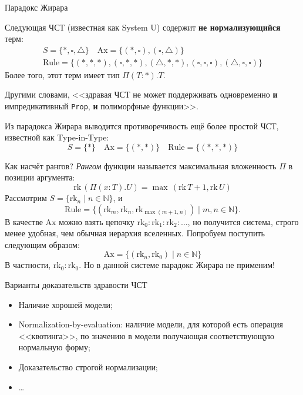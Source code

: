 \documentclass[russian]{beamer}
\begin{document}
\begin{frame}{Парадокс Жирара}
    \begin{theorem}[Girard'72]
    Следующая ЧСТ (известная как System U) содержит
    \textbf{не нормализующийся} терм:
    \[\begin{array}{c}
        S=\{*,\square,\triangle\}
        \quad\mathrm{Ax}=\{
            (*,\square),(\square,\triangle)
        \}
        \\ \mathrm{Rule}=\{
            (*,*,*),(\square,*,*),(\triangle,*,*),
            (\square,\square,\square),
            (\triangle,\square,\square)
        \}
    \end{array}\]
    Более того, этот терм имеет тип $\Pi(T:*).T$.
    \end{theorem}
    Другими словами, <<здравая ЧСТ не может поддерживать
    одновременно \textbf{и} импредикативный
    \texttt{Prop}, \textbf{и} полиморфные функции>>.

    Из парадокса Жирара выводится противоречивость ещё
    более простой ЧСТ, известной как Type-in-Type:
    \[S=\{*\}\quad\mathrm{Ax}=\{(*,*)\}\quad
    \mathrm{Rule}=\{(*,*,*)\}\]
\end{frame}
\begin{frame}{Как насчёт рангов?}
\textit{Рангом} функции называется максимальная
вложенность $\Pi$ в позиции аргумента:
\[\mathrm{rk}\,(\Pi(x:T).U)=\max\,(\mathrm{rk}\,T+1,
    \mathrm{rk}\,U)\]
Рассмотрим $S=\{\mathrm{rk}_n\;|\;n\in\mathbb{N}\}$, и
\[\mathrm{Rule}=\{(\mathrm{rk}_m,\mathrm{rk}_n,
    \mathrm{rk}_{\max(m+1,n)})\;|\;m,n\in\mathbb{N}\}.\]
В качестве $\mathrm{Ax}$ можно взять цепочку
$\mathrm{rk}_0:\mathrm{rk}_1:\mathrm{rk}_2:\ldots$, но
получится система, строго менее удобная, чем обычная
иерархия вселенных. Попробуем поступить следующим
образом:
\[\mathrm{Ax}=\{(\mathrm{rk}_n,\mathrm{rk}_0)\;|\;
    n\in\mathbb{N}\}\]
В частности, $\mathrm{rk}_0:\mathrm{rk}_0$. Но в данной
системе парадокс Жирара не применим!
\end{frame}
\begin{frame}{Варианты доказательств здравости ЧСТ}
\begin{itemize}
    \item Наличие хорошей модели;
    \item Normalization-by-evaluation: наличие модели,
        для которой есть операция <<квотинга>>, по
        значению в модели получающая соответствующую
        нормальную форму;
    \item Доказательство строгой нормализации;
    \item \dots
\end{itemize}
\end{frame}
\end{document}
